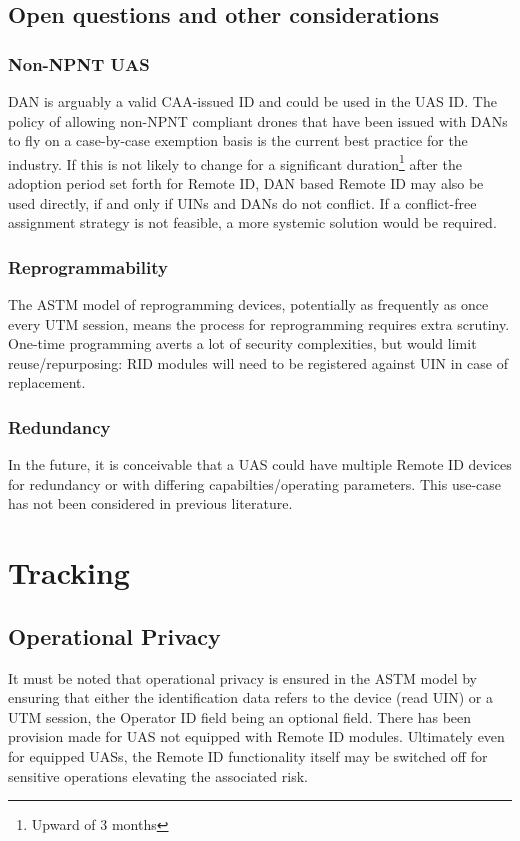 \documentclass{ua_wgs_base}
\begin{document}
\subsection{Open questions and other considerations}

\subsubsection{Non-NPNT UAS}

DAN is arguably a valid CAA-issued ID and could be used in the
UAS ID. The policy of allowing non-NPNT compliant drones that have
been issued with DANs to fly on a case-by-case exemption basis is
the current best practice for the industry. If this is not likely
to change for a significant duration\footnote{Upward of 3 months}
after the adoption period set forth for Remote ID, DAN based Remote
ID may also be used directly, if and only if UINs and DANs do not conflict. If
a conflict-free assignment strategy is not feasible, a more systemic
solution would be required.

\subsubsection{Reprogrammability}
The ASTM model of reprogramming devices, potentially as frequently
as once every UTM session, means the process for reprogramming requires
extra scrutiny. One-time programming averts a lot of security complexities,
but would limit reuse/repurposing: RID modules will need to be registered
against UIN in case of replacement.

\subsubsection{Redundancy}

In the future, it is conceivable that a UAS could have multiple Remote ID
devices for redundancy or with differing capabilties/operating parameters.
This use-case has not been considered in previous literature.

\section{Tracking}

\subsection{Operational Privacy}

It must be noted that operational privacy is ensured in the ASTM model
by ensuring that either the identification data refers to the device
(read UIN) or a UTM session, the Operator ID field being an optional
field. There has been provision made for UAS not equipped with Remote
ID modules. Ultimately even for equipped UASs, the Remote ID functionality
itself may be switched off for sensitive operations elevating the
associated risk.
\end{document}
